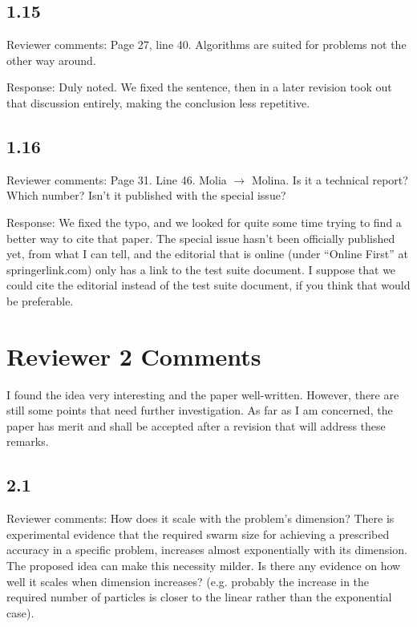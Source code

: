 \documentclass[onecolumn, 12pt]{article}
\begin{document}
\subsection*{1.15}

Reviewer comments: Page 27, line 40. Algorithms are suited for problems not the
other way around.

Response: Duly noted.  We fixed the sentence, then in a later revision took out
that discussion entirely, making the conclusion less repetitive.

\subsection*{1.16}

Reviewer comments: Page 31. Line 46. Molia $\rightarrow$ Molina. Is it a
technical report?  Which number?  Isn't it published with the special issue?

Response:  We fixed the typo, and we looked for quite some time trying to find
a better way to cite that paper.  The special issue hasn't been officially
published yet, from what I can tell, and the editorial that is online (under
``Online First'' at springerlink.com) only has a link to the test suite
document.  I suppose that we could cite the editorial instead of the test suite
document, if you think that would be preferable.

\section*{Reviewer 2 Comments}

I found the idea very interesting and the paper well-written. However, there
are still some points that need further investigation.  As far as I am
concerned, the paper has merit and shall be accepted after a revision that will
address these remarks.

\subsection*{2.1}

Reviewer comments: How does it scale with the problem's dimension? There is
experimental evidence that the required swarm size for achieving a prescribed
accuracy in a specific problem, increases almost exponentially with its
dimension. The proposed idea can make this necessity milder. Is there any
evidence on how well it scales when dimension increases? (e.g. probably the
increase in the required number of particles is closer to the linear rather
than the exponential case).
\end{document}
